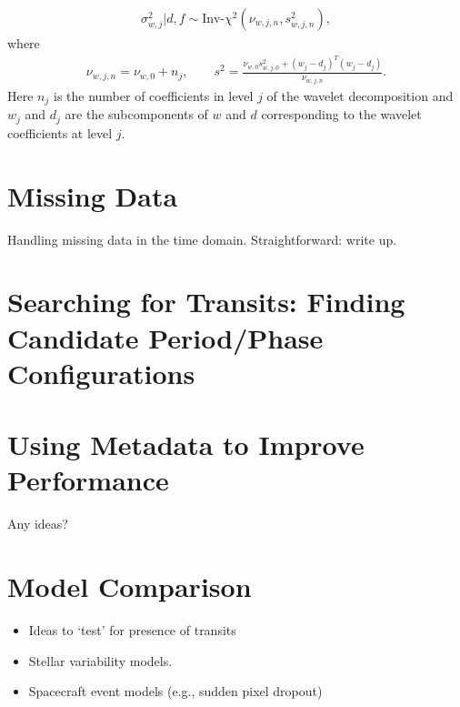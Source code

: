 \documentclass[a4paper,11pt]{article}
\begin{document}
\begin{itemize}
\begin{align*}
 \sigma^{2}_{w,j} | d,f \sim \textrm{Inv-}\chi^{2}(\nu_{w,j,n},s_{w,j,n}^{2}) ,
\end{align*} 
where 
\begin{align*}
 \nu_{w,j,n} = \nu_{w,0} + n_{j} , \qquad s^{2} = \frac{\nu_{w,0}s_{w,j,0}^{2}+(w_{j}-d_{j})^{T}(w_{j}-d_{j})}{\nu_{w,j,n}} .
\end{align*}
Here $n_{j}$ is the number of coefficients in level $j$ of the wavelet decomposition and $w_{j}$ and $d_{j}$ are the subcomponents of $w$ and $d$ corresponding to the wavelet coefficients at level $j$.
\end{itemize}

\section{Missing Data}
Handling missing data in the time domain. Straightforward: write up.

\section{Searching for Transits: Finding Candidate Period/Phase Configurations}

\section{Using Metadata to Improve Performance}
Any ideas?

\section{Model Comparison}
\begin{itemize}
\item Ideas to \lq{}test\rq{} for presence of transits
\item Stellar variability models. 
\item Spacecraft event models (e.g., sudden pixel dropout)
\end{itemize}
\end{document}
